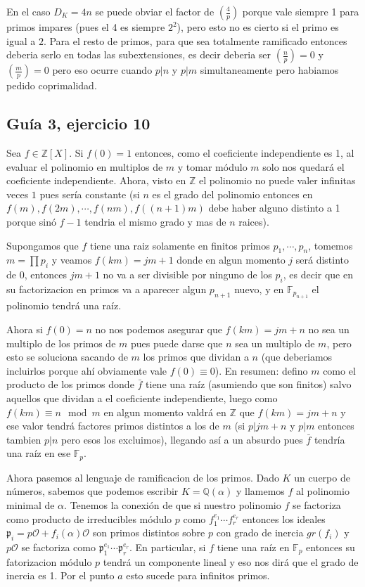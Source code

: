 \documentclass[12pt]{amsart}
\newcommand{\QQ}{\mathbb{Q}}
\newcommand{\ZZ}{\mathbb{Z}}
\newcommand{\FF}{\mathbb{F}}
\newcommand{\pp}{\mathfrak{p}}
\newcommand{\OO}{\mathcal{O}}
\newcommand{\leg}[2]{\left( \frac{#1}{#2} \right)}
\theoremstyle{plain}
\begin{document}
En el caso $D_K=4n$ se puede obviar el factor de $\leg{4}{p}$ porque vale siempre 1 para primos impares (pues el 4 es siempre $2^2$), pero esto no es cierto si el primo es igual a $2$. Para el resto de primos, para que sea totalmente ramificado entonces deberia serlo en todas las subextensiones, es decir deberia ser $\leg{n}{p}= 0$ y $\leg{m}{p}= 0$ pero eso ocurre cuando $p|n$ y $p|m$ simultaneamente pero habiamos pedido coprimalidad.

\subsection*{Guía 3, ejercicio 10}

Sea $f\in \ZZ[X]$. Si $f(0)=1$ entonces, como el coeficiente 
independiente es 1, al evaluar el polinomio en multiplos de $m$ y 
tomar módulo $m$ solo nos quedará el coeficiente independiente. Ahora,
visto en $\ZZ$ el polinomio no puede valer infinitas veces $1$ pues 
sería constante (si $n$ es el grado del polinomio entonces en $f(m), 
f(2m), \cdots, f(nm), f((n+1)m)$ debe haber alguno distinto a 1 
porque sinó $f-1$ tendria el mismo grado y mas de $n$ raices). 

Supongamos que $f$ tiene una raiz solamente en finitos primos $p_1,
\cdots, p_n$, tomemos $m=\prod p_i$ y veamos $f(km) = jm+1$ donde en
algun momento $j$ será distinto de 0, entonces $jm+1$ no va a ser 
divisible por ninguno de los $p_i$, es decir que en su factorizacion 
en primos va a aparecer algun $p_{n+1}$ nuevo, y en $\FF_{p_{n+1}}$
el polinomio tendrá una raíz.

Ahora si $f(0) = n$ no nos podemos asegurar que $f(km) = jm+n$ no 
sea un multiplo de los primos de $m$ pues puede darse que $n$ sea un
multiplo de $m$, pero esto se soluciona sacando de $m$ los primos que 
dividan a $n$ (que deberiamos incluirlos porque ahí obviamente vale 
$f(0)\equiv 0$). En resumen: defino $m$ como el producto de los primos
donde $\bar{f}$ tiene una raíz (asumiendo que son finitos) salvo 
aquellos que dividan a el coeficiente independiente, luego como 
$f(km) \equiv n \mod m$ en algun momento valdrá en $\ZZ$ que 
$f(km) = jm+n$ y ese valor tendrá factores primos distintos a los de 
$m$ (si $p|jm+n$ y $p|m$ entonces tambien $p|n$ pero esos los 
excluimos), llegando así a un absurdo pues $\bar{f}$ tendría una raíz 
en ese $\FF_p$.

Ahora pasemos al lenguaje de ramificacion de los primos. Dado $K$ un cuerpo de 
números, sabemos que podemos escribir $K=\QQ(\alpha)$ y llamemos $f$ al
polinomio minimal de $\alpha$. Tenemos la
conexión de que si nuestro polinomio $f$ se factoriza como 
producto de irreducibles módulo $p$ como $f_1^{e_1}\cdots f_r^{e_r}$ 
entonces los ideales $\pp_i = p\OO + f_i(\alpha)\OO$ son primos distintos
sobre $p$ con grado de inercia $gr(f_i)$ y $p\OO$ se factoriza como
$\pp_1^{e_1}\cdots \pp_r^{e_r}$. En particular, si $f$ tiene una raíz 
en $\FF_p$ entonces su fatorizacion módulo $p$ tendrá un componente 
lineal y eso nos dirá que el grado de inercia es 1. Por el punto $a$ esto
sucede para infinitos primos.
\end{document}
